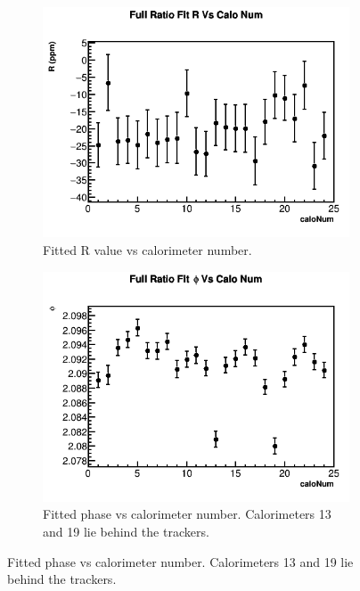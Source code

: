 	\begin{figure}[h]
	\centering
	    \begin{subfigure}[t]{0.4\textwidth}
		    \centering
			\includegraphics[width=\textwidth]{RatioCBOFit_R_Vs_Calo_Canv}
		    \caption{Fitted R value vs calorimeter number.}
	    \end{subfigure}
	    \hspace{4mm}
	    \begin{subfigure}[t]{0.4\textwidth}
		    \centering
			\includegraphics[width=\textwidth]{RatioCBOFit_phi_Vs_Calo_Canv}
		    \caption{Fitted \gmtwo phase vs calorimeter number. Calorimeters 13 and 19 lie behind the trackers.}
		\label{subfig:CaloGM2Phase}
	    \end{subfigure}%

\end{figure}
